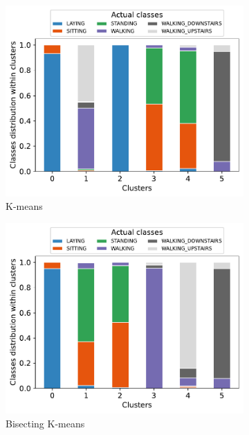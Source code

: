 \documentclass[10pt, a4paper, twocolumn]{article}
\begin{document}
\begin{figure}[t]
    \begin{subfigure}[t]{0.196\textwidth}
        \includegraphics[width=\linewidth]{immagini simone/kmeans_distr.pdf}
        \caption{K-means}
        \label{fig:kmeans_distr}
    \end{subfigure}
    \begin{subfigure}[t]{0.196\textwidth}
        \includegraphics[width=\linewidth]{immagini simone/bisecting_class_distrib.pdf}
        \caption{Bisecting K-means}
        \label{fig:bisecting_distr}
    \end{subfigure}
    \begin{subfigure}[t]{0.196\textwidth}

\end{subfigure}
\end{figure}
\end{document}
